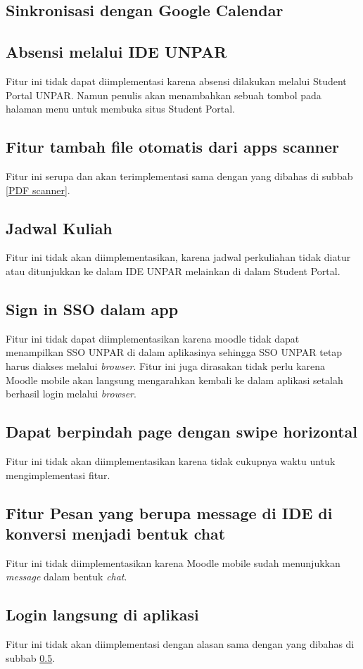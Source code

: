 \subsection{Sinkronisasi dengan Google Calendar}

\subsection{Absensi melalui IDE UNPAR} 
\label{absesnsi IDE}
Fitur ini tidak dapat diimplementasi karena absensi dilakukan melalui Student Portal UNPAR. Namun penulis akan menambahkan sebuah tombol pada halaman menu untuk membuka situs Student Portal.

\subsection{Fitur tambah file otomatis dari apps scanner}
\label{scanner app}
Fitur ini serupa dan akan terimplementasi sama dengan yang dibahas di subbab \ref{PDF scanner}.

\subsection{Jadwal Kuliah}
Fitur ini tidak akan diimplementasikan, karena jadwal perkuliahan tidak diatur atau ditunjukkan ke dalam IDE UNPAR melainkan di dalam Student Portal.

\subsection{Sign in SSO dalam app}
\label{in app sign in}
Fitur ini tidak dapat diimplementasikan karena moodle tidak dapat menampilkan SSO UNPAR di dalam aplikasinya sehingga SSO UNPAR tetap harus diakses melalui \textit{browser}. Fitur ini juga dirasakan tidak perlu karena Moodle mobile akan langsung mengarahkan kembali ke dalam aplikasi setalah berhasil login melalui \textit{browser}.

\subsection{Dapat berpindah page dengan swipe horizontal}
 \label{horizontal swipe}
 Fitur ini tidak akan diimplementasikan karena tidak cukupnya waktu untuk mengimplementasi fitur.

\subsection{Fitur Pesan yang berupa message di IDE di konversi menjadi bentuk chat }
\label{chat}
Fitur ini tidak diimplementasikan karena Moodle mobile sudah menunjukkan \textit{message} dalam bentuk \textit{chat}.

\subsection{Login langsung di aplikasi}
 \label{in app login}
Fitur ini tidak akan diimplementasi dengan alasan sama dengan yang dibahas di subbab \ref{in app sign in}.

